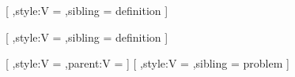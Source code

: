         [
            ,style:V = \redbox
            ,sibling = definition
        ]

        [
            ,style:V = \bluebox
            ,sibling = definition
        ]

        [
            ,style:V = \purplebox
            ,parent:V = \ProblemParent
        ]
        [
            ,style:V = \purplebox
            ,sibling = problem
        ]




